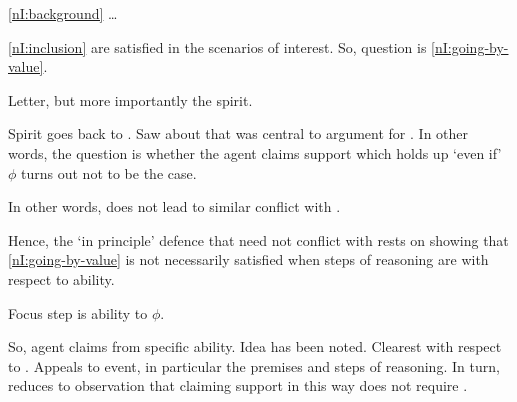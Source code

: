 \begin{note}
  \ref{nI:background} \dots



  \ref{nI:inclusion} are satisfied in the scenarios of interest.
  So, question is \ref{nI:going-by-value}.

  Letter, but more importantly the spirit.

  Spirit goes back to \eiS{}.
  Saw about that \eiS{} was central to argument for \nI{}.
  In other words, the question is whether the agent claims support which holds up `even if' \(\phi\) turns out not to be the case.

  In other words, \adB{} does not lead to similar conflict with \eiS{}.

  Hence, the `in principle' defence that \adB{} need not conflict with \nI{} rests on showing that \ref{nI:going-by-value} is not necessarily satisfied when steps of reasoning are \adB{} with respect to ability.

  Focus step is ability to \(\phi\).

  So, agent claims from specific ability.
  Idea has been noted.
  Clearest with respect to \WR{}.
  Appeals to event, in particular the premises and steps of reasoning.
  In turn, reduces to observation that claiming support in this way does not require \RBV{}.
\end{note}

